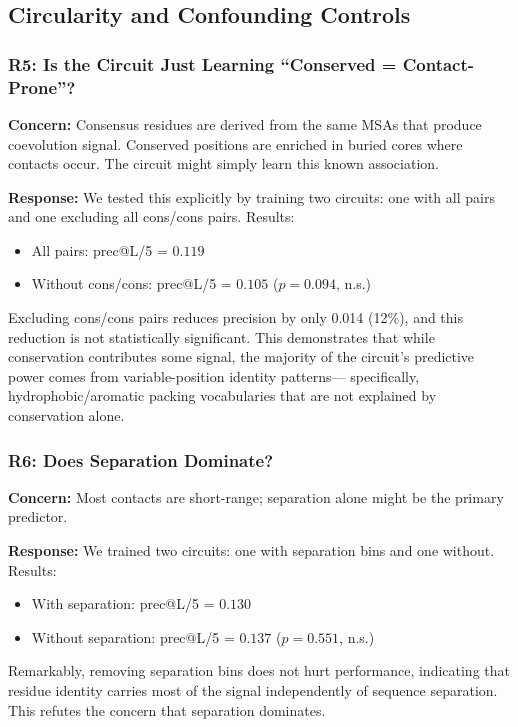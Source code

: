 \subsection{Circularity and Confounding Controls}

\subsubsection{R5: Is the Circuit Just Learning ``Conserved = Contact-Prone''?}
\textbf{Concern:} Consensus residues are derived from the same MSAs that
produce coevolution signal.  Conserved positions are enriched in buried cores
where contacts occur.  The circuit might simply learn this known association.

\textbf{Response:} We tested this explicitly by training two circuits: one
with all pairs and one excluding all cons/cons pairs.  Results:
\begin{itemize}[nosep]
	\item All pairs: prec@L/5 = $0.119$
	\item Without cons/cons: prec@L/5 = $0.105$ ($p = 0.094$, n.s.)
\end{itemize}
Excluding cons/cons pairs reduces precision by only 0.014 (12\%), and this
reduction is not statistically significant.  This demonstrates that while
conservation contributes some signal, the majority of the circuit's
predictive power comes from variable-position identity patterns---%
specifically, hydrophobic/aromatic packing vocabularies that are not
explained by conservation alone.

\subsubsection{R6: Does Separation Dominate?}
\textbf{Concern:} Most contacts are short-range; separation alone might be
the primary predictor.

\textbf{Response:} We trained two circuits: one with separation bins and one
without.  Results:
\begin{itemize}[nosep]
	\item With separation: prec@L/5 = $0.130$
	\item Without separation: prec@L/5 = $0.137$ ($p = 0.551$, n.s.)
\end{itemize}
Remarkably, removing separation bins does not hurt performance, indicating
that residue identity carries most of the signal independently of sequence
separation.  This refutes the concern that separation dominates.

